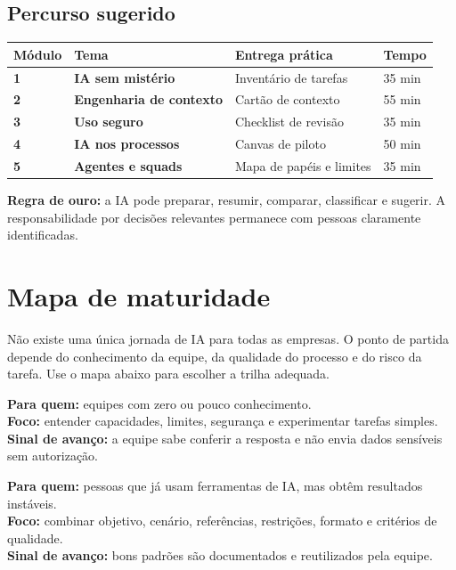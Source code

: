 \documentclass[11pt,a4paper]{article}
\newcommand{\nivel}[2]{\textcolor{#1}{\rule{3mm}{3mm}}\hspace{2mm}\textbf{#2}}
\begin{document}
\subsection*{Percurso sugerido}

\begin{tabularx}{\linewidth}{>{\bfseries}p{16mm} >{\bfseries}p{40mm} X p{18mm}}
\toprule
Módulo & Tema & Entrega prática & Tempo \\
\midrule
1 & IA sem mistério & Inventário de tarefas & 35 min \\
2 & Engenharia de contexto & Cartão de contexto & 55 min \\
3 & Uso seguro & Checklist de revisão & 35 min \\
4 & IA nos processos & Canvas de piloto & 50 min \\
5 & Agentes e squads & Mapa de papéis e limites & 35 min \\
\bottomrule
\end{tabularx}

\begin{alerta}
\textbf{Regra de ouro:} a IA pode preparar, resumir, comparar, classificar e sugerir. A responsabilidade por decisões relevantes permanece com pessoas claramente identificadas.
\end{alerta}

\newpage
\section{Mapa de maturidade}

Não existe uma única jornada de IA para todas as empresas. O ponto de partida depende do conhecimento da equipe, da qualidade do processo e do risco da tarefa. Use o mapa abaixo para escolher a trilha adequada.

\begin{tcolorbox}[colback=brandcyan!8,colframe=brandcyan,title={\nivel{brandcyan}{1 · COMEÇAR COM IA}},fonttitle=\bfseries]
\textbf{Para quem:} equipes com zero ou pouco conhecimento.\\
\textbf{Foco:} entender capacidades, limites, segurança e experimentar tarefas simples.\\
\textbf{Sinal de avanço:} a equipe sabe conferir a resposta e não envia dados sensíveis sem autorização.
\end{tcolorbox}

\begin{tcolorbox}[colback=brandmint!8,colframe=brandmint,title={\nivel{brandmint}{2 · ENGENHARIA DE CONTEXTO}},fonttitle=\bfseries]
\textbf{Para quem:} pessoas que já usam ferramentas de IA, mas obtêm resultados instáveis.\\
\textbf{Foco:} combinar objetivo, cenário, referências, restrições, formato e critérios de qualidade.\\
\textbf{Sinal de avanço:} bons padrões são documentados e reutilizados pela equipe.
\end{tcolorbox}
\end{document}
